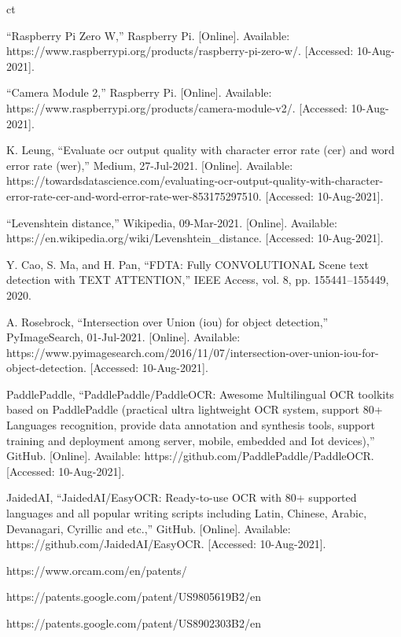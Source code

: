 ct\documentclass[a4paper,11pt]{article}
\begin{document}
\begin{thebibliography}{9}
“Raspberry Pi Zero W,” Raspberry Pi. [Online]. Available: https://www.raspberrypi.org/products/raspberry-pi-zero-w/. [Accessed: 10-Aug-2021]. 

“Camera Module 2,” Raspberry Pi. [Online]. Available: https://www.raspberrypi.org/products/camera-module-v2/. [Accessed: 10-Aug-2021]. 

K. Leung, “Evaluate ocr output quality with character error rate (cer) and word error rate (wer),” Medium, 27-Jul-2021. [Online]. Available: https://towardsdatascience.com/evaluating-ocr-output-quality-with-character-error-rate-cer-and-word-error-rate-wer-853175297510. [Accessed: 10-Aug-2021].

“Levenshtein distance,” Wikipedia, 09-Mar-2021. [Online]. Available: https://en.wikipedia.org/wiki/Levenshtein\_distance. [Accessed: 10-Aug-2021].

Y. Cao, S. Ma, and H. Pan, “FDTA: Fully CONVOLUTIONAL Scene text detection with TEXT ATTENTION,” IEEE Access, vol. 8, pp. 155441–155449, 2020.

A. Rosebrock, “Intersection over Union (iou) for object detection,” PyImageSearch, 01-Jul-2021. [Online]. Available: https://www.pyimagesearch.com/2016/11/07/intersection-over-union-iou-for-object-detection. [Accessed: 10-Aug-2021].

PaddlePaddle, “PaddlePaddle/PaddleOCR: Awesome Multilingual OCR toolkits based on PaddlePaddle (practical ultra lightweight OCR system, support 80+ Languages recognition, provide data annotation and synthesis tools, support training and deployment among server, mobile, embedded and Iot devices),” GitHub. [Online]. Available: https://github.com/PaddlePaddle/PaddleOCR. [Accessed: 10-Aug-2021].

JaidedAI, “JaidedAI/EasyOCR: Ready-to-use OCR with 80+ supported languages and all popular writing scripts including Latin, Chinese, Arabic, Devanagari, Cyrillic and etc.,” GitHub. [Online]. Available: https://github.com/JaidedAI/EasyOCR. [Accessed: 10-Aug-2021].

https://www.orcam.com/en/patents/

https://patents.google.com/patent/US9805619B2/en

https://patents.google.com/patent/US8902303B2/en


\end{thebibliography}
\end{document}
